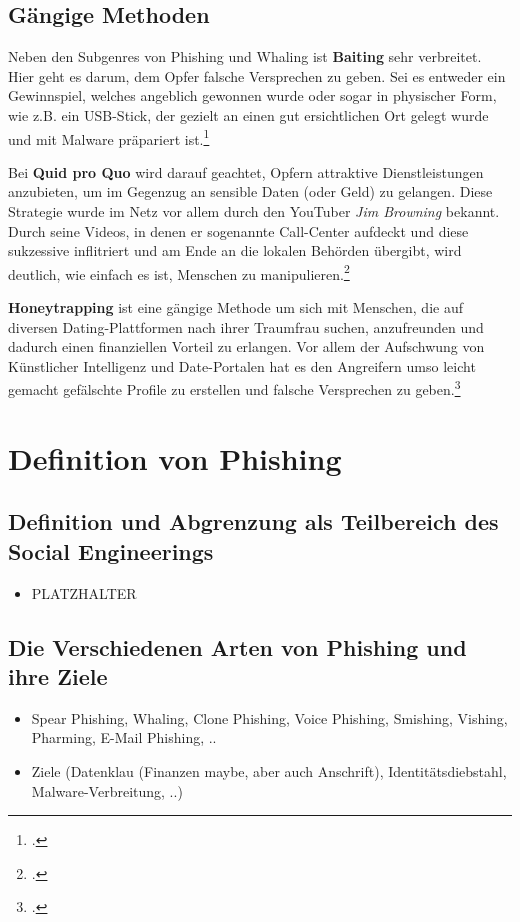 \documentclass[12pt, a4paper, oneside]{scrartcl}
\begin{document}
\subsection{Gängige Methoden}
Neben den Subgenres von Phishing und Whaling ist \textbf{Baiting} sehr verbreitet.
Hier geht es darum, dem Opfer falsche Versprechen zu geben. Sei es entweder ein Gewinnspiel,
welches angeblich gewonnen wurde oder sogar in physischer Form, wie z.B. ein USB-Stick,
der gezielt an einen gut ersichtlichen Ort gelegt wurde und mit Malware präpariert ist.\footcite{CS_10Arten}
\par
Bei \textbf{Quid pro Quo} wird darauf geachtet, Opfern attraktive Dienstleistungen anzubieten, um im Gegenzug
an sensible Daten (oder Geld) zu gelangen. Diese Strategie wurde im Netz vor allem durch den YouTuber \textit{Jim Browning} bekannt.
Durch seine Videos, in denen er sogenannte Call-Center aufdeckt und diese sukzessive inflitriert und
am Ende an die lokalen Behörden übergibt, wird deutlich, wie einfach es ist, Menschen zu manipulieren.\footcite{JB_YouTube}
\par
\textbf{Honeytrapping} ist eine gängige Methode um sich mit Menschen, die auf diversen Dating-Plattformen nach
ihrer Traumfrau suchen, anzufreunden und dadurch einen finanziellen Vorteil zu erlangen. Vor allem 
der Aufschwung von Künstlicher Intelligenz und Date-Portalen hat es den Angreifern umso leicht gemacht
gefälschte Profile zu erstellen und falsche Versprechen zu geben.\footcite{CS_10Arten}


\section{Definition von Phishing}

\subsection{Definition und Abgrenzung als Teilbereich des Social Engineerings}
\begin{itemize}
  \item PLATZHALTER
\end{itemize}


\subsection{Die Verschiedenen Arten von Phishing und ihre Ziele}
\begin{itemize}
  \item Spear Phishing, Whaling, Clone Phishing, Voice Phishing, Smishing, Vishing, Pharming, E-Mail Phishing, ..
  \item Ziele (Datenklau (Finanzen maybe, aber auch Anschrift), Identitätsdiebstahl, Malware-Verbreitung, ..)
\end{itemize}
\end{document}
